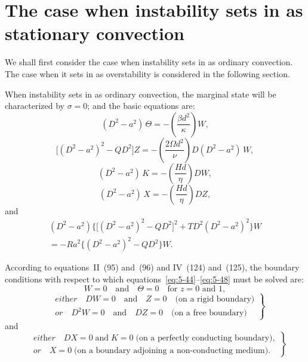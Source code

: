 \section{The case when instability sets in as stationary convection}\label{sec:52}

We shall first consider the case when instability sets in as ordinary
convection.  The case when it sets in as overstability is considered in the
following section.

When instability sets in as ordinary convection, the marginal state will be
characterized by $\sigma = 0$; and the basic equations are:
\begin{equation}
  (D^{2}-a^{2})\,\Theta
  = -\left(\frac{\beta d^{2}}{\kappa}\right)W,
  \label{eq:5-44}
\end{equation}
\begin{equation}
  \bigl[(D^{2}-a^{2})^{2}-QD^{2}\bigr]Z
  = -\left(\frac{2\Omega d^{2}}{\nu}\right)D(D^{2}-a^{2})\,W,
  \label{eq:5-45}
\end{equation}
\begin{equation}
  (D^{2}-a^{2})\,K
  = -\left(\frac{Hd}{\eta}\right)DW,
  \label{eq:5-46}
\end{equation}
\begin{equation}
  (D^{2}-a^{2})\,X
  = -\left(\frac{Hd}{\eta}\right)DZ,
  \label{eq:5-47}
\end{equation}
and
\begin{multline}
  (D^{2}-a^{2})
  \bigl\{\bigl[(D^{2}-a^{2})^{2}-QD^{2}\bigr]^{2}
  +T D^{2}(D^{2}-a^{2})^{2}\bigr\}W \\
  = -\mathit{Ra}^{2}\bigl\{(D^{2}-a^{2})^{2}-QD^{2}\bigr\}W.
  \label{eq:5-48}
\end{multline}

According to equations~II~(95) and~(96) and IV~(124) and~(125), the
boundary conditions with respect to which equations~\eqref{eq:5-44}--\eqref{eq:5-48}
must be solved are:
\begin{equation}
  W = 0 \quad\text{and}\quad \Theta = 0 \quad\text{for } z = 0 \text{ and } 1,
  \label{eq:5-49}
\end{equation}
\begin{equation}
  \left.
  \begin{aligned}
    &\textit{either}\quad DW = 0 \quad\text{and}\quad Z = 0
      \quad\text{(on a rigid boundary)} \\
    &\textit{or}\quad D^{2}W = 0 \quad\text{and}\quad DZ = 0
      \quad\text{(on a free boundary)}
  \end{aligned}
  \right\}
  \label{eq:5-50}
\end{equation}
and
\begin{equation}
  \left.
  \begin{aligned}
    &\textit{either}\quad DX = 0 \;\text{and}\; K = 0
      \;\text{(on a perfectly conducting boundary)}, \\
    &\textit{or}\quad X = 0
      \;\text{(on a boundary adjoining a non-conducting medium)}.
  \end{aligned}
  \right\}
  \label{eq:5-51}
\end{equation}

